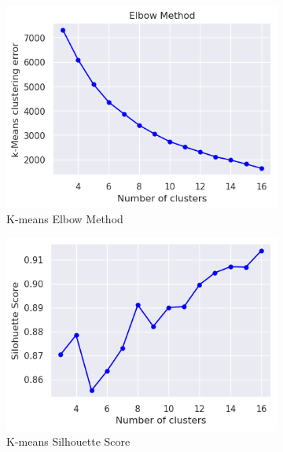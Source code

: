         \begin{figure}[H]
            \centering
            \begin{subfigure}[c]{0.47\textwidth}
                \centering
                \includegraphics[width=\textwidth]{../figures/plots/section3/k-means_clustering_error.png}
                \caption{K-means Elbow Method}
                \label{fig:tsne_kmeans}
            \end{subfigure}
            \hfill
            \begin{subfigure}[c]{0.47\textwidth}
                \centering
                \includegraphics[width=\textwidth]{../figures/plots/section3/k-means_silohuette_score.png}
                \caption{K-means Silhouette Score}
                \label{fig:tsne_gmm}
            \end{subfigure}
            \vspace{-0.1cm}
            \caption{}
            \label{fig:}
        \end{figure}
        
